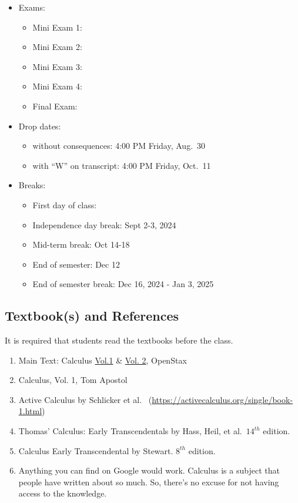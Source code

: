 \documentclass[
]{article}
\providecommand{\tightlist}{%
  \setlength{\itemsep}{0pt}\setlength{\parskip}{0pt}}
\begin{document}
\begin{itemize}
\tightlist
\item
  Exams:

  \begin{itemize}
  \tightlist
  \item
    Mini Exam 1:
  \item
    Mini Exam 2:
  \item
    Mini Exam 3:
  \item
    Mini Exam 4:
  \item
    Final Exam:
  \end{itemize}
\item
  Drop dates:

  \begin{itemize}
  \tightlist
  \item
    without consequences: 4:00 PM Friday, Aug.~30
  \item
    with ``W'' on transcript: 4:00 PM Friday, Oct.~11
  \end{itemize}
\item
  Breaks:

  \begin{itemize}
  \tightlist
  \item
    First day of class:
  \item
    Independence day break: Sept 2-3, 2024
  \item
    Mid-term break: Oct 14-18
  \item
    End of semester: Dec 12
  \item
    End of semester break: Dec 16, 2024 - Jan 3, 2025
  \end{itemize}
\end{itemize}

\hypertarget{textbooks-and-references}{%
\subsection*{Textbook(s) and References}\label{textbooks-and-references}}

It is required that students read the textbooks before the class.

\begin{enumerate}
\def\labelenumi{\arabic{enumi}.}
\item
  Main Text: Calculus \href{https://openstax.org/details/books/calculus-volume-1}{Vol.1} \& \href{https://openstax.org/details/books/calculus-volume-2}{Vol. 2}, OpenStax
\item
  Calculus, Vol. 1, Tom Apostol
\item
  Active Calculus by Schlicker et al.~
  (\url{https://activecalculus.org/single/book-1.html})
\item
  Thomas' Calculus: Early Transcendentals by Hass, Heil, et al.~\(14^{th}\) edition.
\item
  Calculus Early Transcendental by Stewart. \(8^{th}\) edition.
\item
  Anything you can find on Google would work.
  Calculus is a subject that people have written about
  so much. So, there's no excuse for not having access
  to the knowledge.
\end{enumerate}
\end{document}
